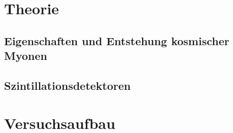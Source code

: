 \section{Theorie}
\subsection{Eigenschaften und Entstehung kosmischer Myonen}
\subsection{Szintillationsdetektoren}
\section{Versuchsaufbau}

